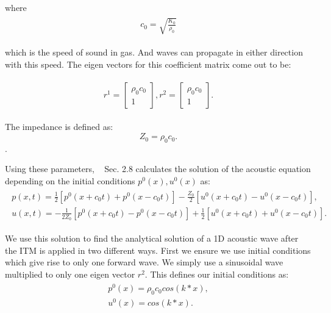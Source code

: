 where 
\begin{align}
    \begin{split}
        c_0 = \sqrt{\frac{K_0}{\rho_0}}
    \end{split}
\end{align}

which is the speed of sound in gas. And waves can propagate in either direction with this speed. The eigen vectors for this coefficient matrix come out to be:

\begin{align}
    \begin{split}
        r^1 = \begin{bmatrix}
            \rho_0 c_0 \\
            1
        \end{bmatrix}, 
        r^2 = \begin{bmatrix}
            \rho_0 c_0 \\
            1
        \end{bmatrix}.
    \end{split}
\end{align}

The impedance is defined as:
\begin{equation}
    Z_0 = \rho_0 c_0.
\end{equation}.

Using these parameters, ~\parencite{leveque_2002} Sec. 2.8 calculates the solution of the acoustic equation depending on the initial conditions $p^0(x), u^0(x)$ as:
\begin{align}
    \begin{split}
        p(x,t) = \frac{1}{2}\left[p^0\left(x + c_0t\right) + p^0\left(x - c_0t\right)\right] - \frac{Z_0}{2}\left[u^0\left(x+c_0t\right) - u^0\left(x-c_0t\right)\right], \\
        u(x,t) = -\frac{1}{2Z_0}\left[p^0\left(x+c_0t\right) - p^0\left(x-c_0t\right)\right] + \frac{1}{2}\left[u^0\left(x+c_0t\right) + u^0\left(x-c_0t\right)\right] .
    \end{split}
    \label{eq:solutionacoustic}
\end{align}

We use this solution to find the analytical solution of a 1D acoustic wave after the \ac{ITM} is applied in two different ways. First we ensure we use initial conditions which give rise to only one forward wave. We simply use a sinusoidal wave multiplied to only one eigen vector $r^2$.
This defines our initial conditions as:
\begin{align}
    \begin{split}
        p^0\left(x\right) = \rho_0c_0cos\left(k*x\right), \\
        u^0\left(x\right) = cos\left(k*x\right) .
    \end{split}
    \label{eq:initialconditions}
\end{align}

